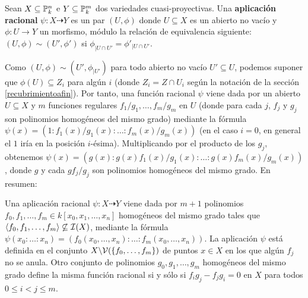 \documentclass[ACGA.tex]{subfiles}
\begin{document}
\begin{defi}
 Sean $X\subseteq\mathbb{P}^n_k$ e $Y\subseteq\mathbb{P}^m_k$ dos variedades cuasi-proyectivas. Una {\bf aplicación racional} $\psi:X\dashrightarrow Y$ es un par $(U,\phi)$ donde $U\subseteq X$ es un abierto no vacío y $\phi:U\to Y$ un morfismo, módulo la relación de equivalencia siguiente: $(U,\phi)\sim(U',\phi')$ si $\phi_{|U\cap U'}=\phi'_{|U\cap U'}$.
\end{defi}

Como $(U,\phi)\sim (U',\phi_{|U'})$ para todo abierto no vacío $U'\subseteq U$, podemos suponer que $\phi(U)\subseteq Z_i$ para algún $i$ (donde $Z_i=Z\cap U_i$ según la notación de la sección \ref{recubrimientoafin}). Por tanto, una función racional $\psi$ viene dada por un abierto $U\subseteq X$ y $m$ funciones regulares $f_1/g_1,\ldots,f_m/g_m$ en $U$ (donde para cada $j$, $f_j$ y $g_j$ son polinomios homogéneos del mismo grado) mediante la fórmula $\psi(x)=(1:f_1(x)/g_1(x):\ldots:f_m(x)/g_m(x))$ (en el caso $i=0$, en general el $1$ iría en la posición $i$-ésima). Multiplicando por el producto de los $g_j$, obtenemos $\psi(x)=(g(x):g(x)f_1(x)/g_1(x):\ldots:g(x)f_m(x)/g_m(x))$, donde $g$ y cada $gf_j/g_j$ son polinomios homogéneos del mismo grado. En resumen:

\begin{prop}
 Una aplicación racional $\psi:X\dashrightarrow Y$ viene dada por $m+1$ polinomios $f_0,f_1,\ldots,f_m\in k[x_0,x_1,\ldots,x_n]$ homogéneos del mismo grado tales que $\langle f_0,f_1,\ldots,f_m\rangle\not\subseteq\mathcal{I}(X)$, mediante la fórmula $\psi(x_0:\ldots:x_n)=(f_0(x_0,\ldots,x_n):\ldots:f_m(x_0,\ldots,x_n))$. La aplicación $\psi$ está definida en el conjunto $X\backslash\mathcal{V}(\{f_0,\ldots,f_m\})$ de puntos $x\in X$ en los que algún $f_j$ no se anula. Otro conjunto de polinomios $g_0,g_1,\ldots,g_m$ homogéneos del mismo grado define la misma función racional si y sólo si $f_ig_j-f_jg_i=0$ en $X$ para todos $0\leq i<j\leq m$. 
\end{prop}
\end{document}
